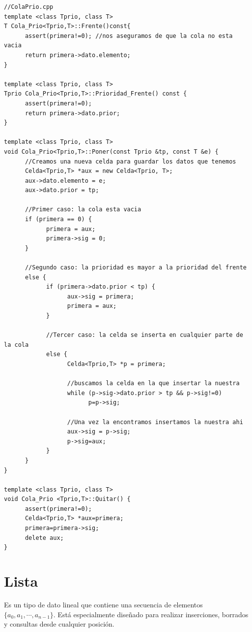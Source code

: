 \documentclass[10pt,a4paper,spanish]{report}
\begin{document}
\begin{verbatim}
//ColaPrio.cpp
template <class Tprio, class T>
T Cola_Prio<Tprio,T>::Frente()const{
      assert(primera!=0); //nos aseguramos de que la cola no esta vacia
      return primera->dato.elemento;
}

template <class Tprio, class T>
Tprio Cola_Prio<Tprio,T>::Prioridad_Frente() const {
      assert(primera!=0);
      return primera->dato.prior;
}

template <class Tprio, class T>
void Cola_Prio<Tprio,T>::Poner(const Tprio &tp, const T &e) {
      //Creamos una nueva celda para guardar los datos que tenemos
      Celda<Tprio,T> *aux = new Celda<Tprio, T>;
      aux->dato.elemento = e;
      aux->dato.prior = tp;

      //Primer caso: la cola esta vacia
      if (primera == 0) {
            primera = aux;
            primera->sig = 0;
      }

      //Segundo caso: la prioridad es mayor a la prioridad del frente
      else {
            if (primera->dato.prior < tp) {
                  aux->sig = primera;
                  primera = aux;
            }

            //Tercer caso: la celda se inserta en cualquier parte de la cola
            else {
                  Celda<Tprio,T> *p = primera;

                  //buscamos la celda en la que insertar la nuestra
                  while (p->sig->dato.prior > tp && p->sig!=0)
                        p=p->sig;

                  //Una vez la encontramos insertamos la nuestra ahi
                  aux->sig = p->sig;
                  p->sig=aux;
            }
      }
}

template <class Tprio, class T>
void Cola_Prio <Tprio,T>::Quitar() {
      assert(primera!=0);
      Celda<Tprio,T> *aux=primera;
      primera=primera->sig;
      delete aux;
}
\end{verbatim}

\section{\textcolor[rgb]{0.2,0.5,0.5}Lista}
\noindent
Es un tipo de dato lineal que contiene una secuencia de elementos $\{a_{0},a_{1},\cdots,a_{n-1}\}$. Está especialmente diseñado para realizar inserciones, borrados y consultas desde cualquier posición.
\end{document}
